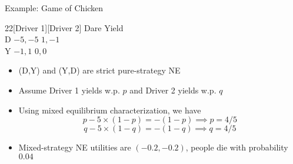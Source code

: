 \documentclass[11pt,aspectratio=169]{beamer}
\begin{document}
  \begin{frame}{Example: Game of Chicken}
   \begin{center}
    \hspace{-9.8em}
    \begin{game}{2}{2}[Driver 1][Driver 2]
     	\> Dare		\> Yield			\\
     D	\> $-5, -5$	\> $ 1, -1$		\\
     Y	\> $-1,  1$	\> $ 0,  0$
    \end{game}
   \end{center}
   \begin{itemize}[<+->]
    \item (D,Y) and (Y,D) are \alert{strict} pure-strategy NE
    \item Assume Driver 1 yields w.p. $p$ and Driver 2 yields w.p. $q$
    \item Using mixed equilibrium characterization, we have 
	$$ p - 5\times (1 - p) = - (1 - p) \implies p = 4/5 $$
    $$ q - 5\times (1 - q) = - (1 - q) \implies q = 4/5 $$
    \item Mixed-strategy NE utilities are $(-0.2, -0.2)$, people \alert{die} with probability $0.04$
   \end{itemize}
  \end{frame}
\end{document}
